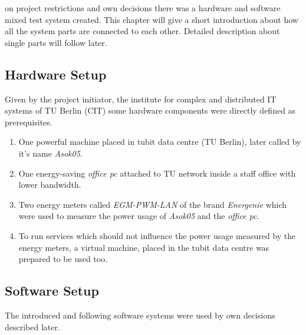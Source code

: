 
 on project restrictions and own decisions there was a hardware and software mixed test system created. This chapter will give a short introduction about how all the system parts are connected to each other. Detailed description about single parts will follow later.

\subsection{Hardware Setup}

Given by the project initiator, the institute for complex and distributed IT systems of TU Berlin (CIT) some hardware components were directly defined as prerequisites.

\begin{enumerate}

\item One powerful machine placed in tubit data centre (TU Berlin), later called by it's name \textit{Asok05}.

\item One energy-saving \textit{office pc} attached to TU network inside a staff office with lower bandwidth.

\item Two energy meters called \textit{EGM-PWM-LAN} of the brand \textit{Energenie} which were used to measure the power usage of \textit{Asok05} and the \textit{office pc}.

\item To run services which should not influence the power usage measured by the energy meters, a virtual machine, placed in the tubit data centre was prepared to be used too.

\end{enumerate}


\subsection{Software Setup}

The introduced and following software systems were used by own decisions described later.

